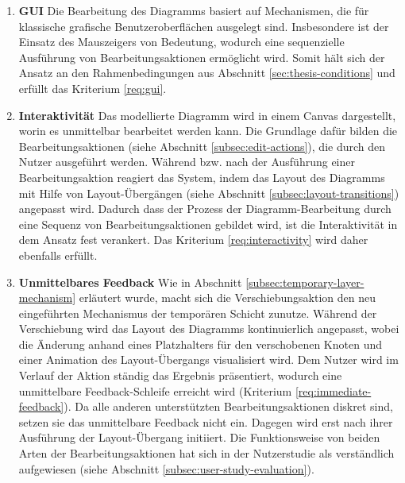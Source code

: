 \begin{enumerate}[label={K.\arabic*}]

\item
\label{eval:gui}
\textbf{GUI}
Die Bearbeitung des Diagramms basiert auf Mechanismen, die für klassische grafische Benutzeroberflächen ausgelegt sind. Insbesondere ist der Einsatz des Mauszeigers von Bedeutung, wodurch eine sequenzielle Ausführung von Bearbeitungsaktionen ermöglicht wird. Somit hält sich der Ansatz an den Rahmenbedingungen aus Abschnitt \ref{sec:thesis-conditions} und erfüllt das Kriterium \ref{req:gui}.

\item
\label{eval:interactivity}
\textbf{Interaktivität}
Das modellierte Diagramm wird in einem Canvas dargestellt, worin es unmittelbar bearbeitet werden kann. Die Grundlage dafür bilden die Bearbeitungsaktionen (siehe Abschnitt \ref{subsec:edit-actions}), die durch den Nutzer ausgeführt werden. Während bzw. nach der Ausführung einer Bearbeitungsaktion reagiert das System, indem das Layout des Diagramms mit Hilfe von Layout-Übergängen (siehe Abschnitt \ref{subsec:layout-transitions}) angepasst wird. Dadurch dass der Prozess der Diagramm-Bearbeitung durch eine Sequenz von Bearbeitungsaktionen gebildet wird, ist die Interaktivität in dem Ansatz fest verankert. Das Kriterium \ref{req:interactivity} wird daher ebenfalls erfüllt.

\item
\label{eval:immediate-feedback}
\textbf{Unmittelbares Feedback}
Wie in Abschnitt \ref{subsec:temporary-layer-mechanism} erläutert wurde, macht sich die Verschiebungsaktion den neu eingeführten Mechanismus der temporären Schicht zunutze. Während der Verschiebung wird das Layout des Diagramms kontinuierlich angepasst, wobei die Änderung anhand eines Platzhalters für den verschobenen Knoten und einer Animation des Layout-Übergangs visualisiert wird. Dem Nutzer wird im Verlauf der Aktion ständig das Ergebnis präsentiert, wodurch eine unmittelbare Feedback-Schleife erreicht wird (Kriterium \ref{req:immediate-feedback}). Da alle anderen unterstützten Bearbeitungsaktionen diskret sind, setzen sie das unmittelbare Feedback nicht ein. Dagegen wird erst nach ihrer Ausführung der Layout-Übergang initiiert. Die Funktionsweise von beiden Arten der Bearbeitungsaktionen hat sich in der Nutzerstudie als verständlich aufgewiesen (siehe Abschnitt \ref{subsec:user-study-evaluation}).


\end{enumerate}
